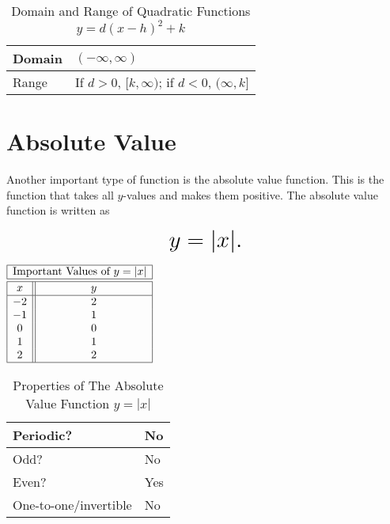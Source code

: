 \documentclass[nooutcomes]{ximera}
\begin{document}
\begin{table}[h]
\caption{\label{tab:quadraticdr}Domain and Range of Quadratic Functions $y = d(x - h)^2 + k$}
\centering
\begin{tabular}{l|l}
Domain & $(-\infty, \infty)$ \\ \hline
Range & If $d > 0$, $[k, \infty)$; if $d <  0$, $(\infty, k]$
\end{tabular}
\end{table}

\newpage


\section{Absolute Value}
Another important type of function is the absolute value function.  This is the function that takes all $y$-values and makes them positive.  The absolute value function is written as 

$$ \mbox{\huge $y=|x|.$}$$ 

\begin{image}
\end{image}

\begin{center}
\(
\begin{array}{ |c || c|  }
 \hline
 \multicolumn{2}{|c|}{\text{\normalfont Important Values of } y=|x|} \\
\hline
 \hline
 x & y\\
 \hline
 -2&2\\ 
-1&1\\ 
0&0\\
 1&1\\
 2&2\\
 \hline
\end{array}
\)
\end{center}

\begin{table}[h]
\caption{\label{tab:absproperties}Properties of The Absolute Value Function $y = |x|$}
\centering
\begin{tabular}{l|l}
Periodic? & No\\ \hline
Odd? &  No \\ \hline
Even? & Yes \\ \hline
One-to-one/invertible & No
\end{tabular}
\end{table}
\end{document}
